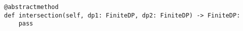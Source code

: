 \begin{verbatim}
@abstractmethod
def intersection(self, dp1: FiniteDP, dp2: FiniteDP) -> FiniteDP:
    pass
\end{verbatim}